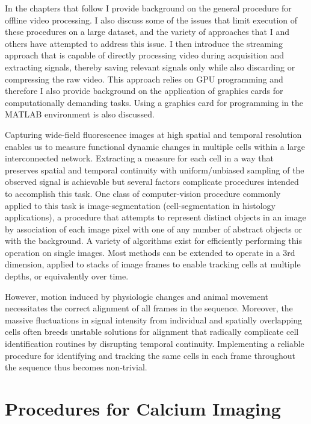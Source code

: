 \documentclass[../main.tex]{subfiles}
\begin{document}
In the chapters that follow I provide background on the general procedure for offline video processing.
I also discuss some of the issues that limit execution of these procedures on a large dataset, and the variety of approaches that I and others have attempted to address this issue.
I then introduce the streaming approach that is capable of directly processing video during acquisition and extracting signals, thereby saving relevant signals only while also discarding or compressing the raw video.
This approach relies on GPU programming and therefore I also provide background on the application of graphics cards for computationally demanding tasks.
Using a graphics card for programming in the MATLAB environment is also discussed.

Capturing wide-field fluorescence images at high spatial and temporal resolution enables us to measure functional dynamic changes in multiple cells within a large interconnected network.
Extracting a measure for each cell in a way that preserves spatial and temporal continuity with uniform/unbiased sampling of the observed signal is achievable but several factors complicate procedures intended to accomplish this task.
One class of computer-vision procedure commonly applied to this task is image-segmentation (cell-segmentation in histology applications), a procedure that attempts to represent distinct objects in an image by association of each image pixel with one of any number of abstract objects or with the background.
A variety of algorithms exist for efficiently performing this operation on single images.
Most methods can be extended to operate in a 3rd dimension, applied to stacks of image frames to enable tracking cells at multiple depths, or equivalently over time.

However, motion induced by physiologic changes and animal movement necessitates the correct alignment of all frames in the sequence.
Moreover, the massive fluctuations in signal intensity from individual and spatially overlapping cells often breeds unstable solutions for alignment that radically complicate cell identification routines by disrupting temporal continuity.
Implementing a reliable procedure for identifying and tracking the same cells in each frame throughout the sequence thus becomes non-trivial.

\section{Procedures for Calcium Imaging}\label{sec:procedures-for-calcium-imaging}
\end{document}
